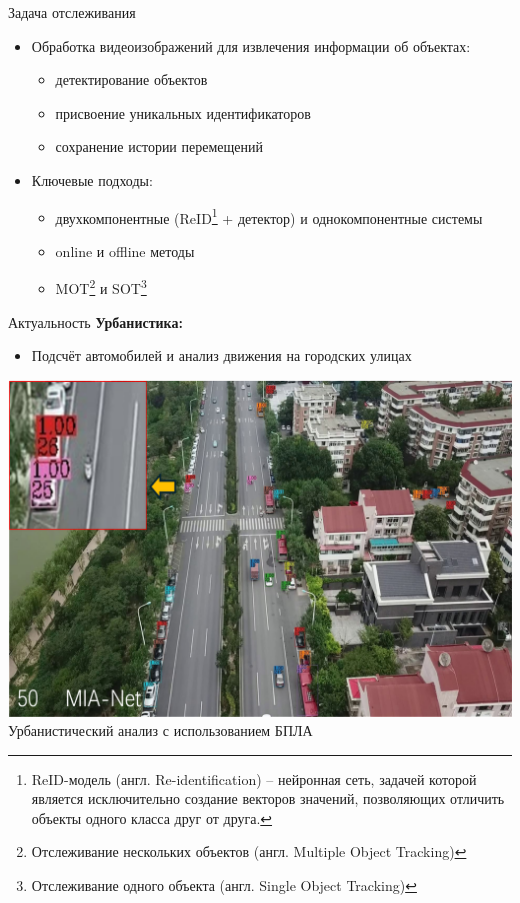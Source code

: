 \documentclass{beamer} %
\begin{document}
\begin{frame}{Задача отслеживания}
  \begin{itemize}
    \item Обработка видеоизображений для извлечения информации об объектах:
      \begin{itemize}
        \item детектирование объектов
        \item присвоение уникальных идентификаторов
        \item сохранение истории перемещений
      \end{itemize}
    \item Ключевые подходы:
      \begin{itemize}
        \item двухкомпонентные (ReID\footnote{ReID-модель (англ. Re-identification) -- нейронная сеть, задачей которой является исключительно создание векторов значений, позволяющих отличить объекты одного класса друг от друга.} + детектор) и однокомпонентные системы
        \item online и offline методы
        \item MOT\footnote{Отслеживание нескольких объектов (англ. Multiple Object Tracking)} и SOT\footnote{Отслеживание одного объекта (англ. Single Object Tracking)}
      \end{itemize}

  \end{itemize}
\end{frame}

\begin{frame}{Актуальность}
  \textbf{Урбанистика:}
  \begin{itemize}
    \item Подсчёт автомобилей и анализ движения на городских улицах
  \end{itemize}
  \vspace{0.5cm}
  \centering
  \includegraphics[width=0.7\linewidth]{review/urban_uav.png}\\
  \small Урбанистический анализ с использованием БПЛА
\end{frame}
\end{document}
